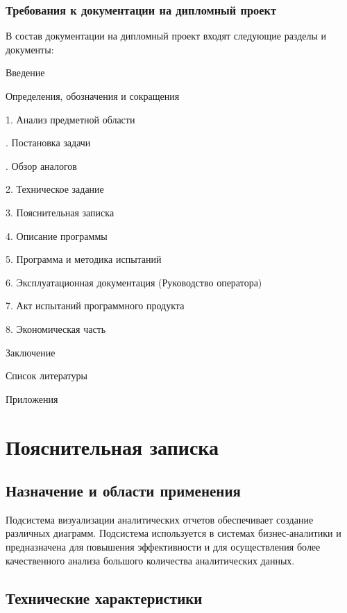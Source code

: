 \documentclass[a4paper]{extarticle}
\begin{document}
\subsubsection{Требования к документации на дипломный проект}
В состав документации на дипломный проект входят следующие разделы и документы:\par
Введение\par
\qquad Определения, обозначения и сокращения\par
1.	Анализ предметной области\par
{}.	Постановка задачи\par
{}.	Обзор аналогов\par
2.	Техническое задание\par
3.	Пояснительная записка\par
4.	Описание программы\par
5.	Программа и методика испытаний\par
6.	Эксплуатационная документация (Руководство оператора)\par
7.	Акт испытаний программного продукта\par
8.	Экономическая часть\par
Заключение\par
Список литературы\par
Приложения\par

\section{Пояснительная записка}

\subsection{Назначение и области применения}
Подсистема визуализации аналитических отчетов обеспечивает создание различных диаграмм. Подсистема используется в системах бизнес-аналитики и предназначена для повышения эффективности и для осуществления более качественного анализа большого количества аналитических данных.

\subsection{Технические характеристики}
\end{document}
